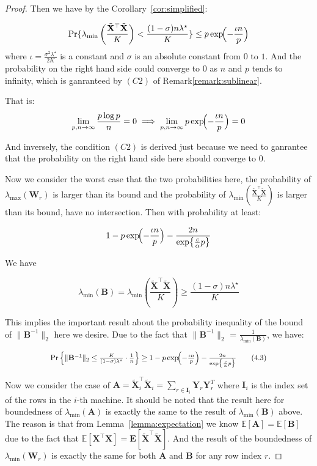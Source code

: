 \documentclass[11pt]{article}
\numberwithin{equation}{section}
\theoremstyle{plain}
\theoremstyle{definition}
\theoremstyle{remark}
\begin{document}
\begin{proof}
Then we have by the Corollary~\ref{cor:simplified}:

\[
  \Pr\{\lambda_{\min}\left(\frac{\tilde{\mathbf{X}}^{\top}\tilde{\mathbf{X}}}{K}\right)<\frac{(1-\sigma)n\lambda^{\star}}{K}\}
    \le p\exp\!\Bigl(-\frac{\iota n}{p}\Bigr)
\]
where $\iota = \frac{\sigma^{2}\lambda^{\star}}{2 K}$ is a constant and $\sigma$ is an absolute constant from $0$ to $1$. And the probability on the right hand side could converge to 0 as $n$ and $p$ tends to infinity, which is ganranteed by $(C2)$ of Remark\ref{remark:sublinear}.

That is:
\[
\lim_{p,n \to \infty} \frac{p \log p}{n} = 0 \implies  \lim_{p,n \to \infty} p\exp\!\Bigl(-\frac{\iota n}{p}\Bigr) = 0
\]

And inversely, the condition $(C2)$ is derived just because we need to ganrantee that the probability on the right hand side here should converge to 0.

Now we consider the worst case that the two probabilities here, the probability of $\lambda_{\max}(\mathbf{W}_r)$ is larger than its bound and the probability of $\lambda_{\min}(\frac{\tilde{\mathbf{X}}^{\top}\tilde{\mathbf{X}}}{K})$ is larger than its bound, have no intersection. Then with probability at least:

\[
1- p\exp\!\Bigl(-\frac{\iota n}{p}\Bigr) - \frac{2 n}{\exp\bigl\{\frac{c}{\alpha} p\bigr\}}
\]

We have 

\[
  \lambda_{\min}(\mathbf{B}) = \lambda_{\min}(\frac{\tilde{\mathbf{X}}^{\top}\tilde{\mathbf{X}}}{K})\ge\frac{(1-\sigma)n\lambda^{\star}}{K}
\]

This implies the important result about the probability inequality of the bound of \(\|\mathbf{B}^{-1}\|_2\) here we desire. Due to the fact that \(\|\mathbf{B}^{-1}\|_2\) = \(\frac{1}{\lambda_{\min}(\mathbf{B})}\), we have:

\[
\scalebox{0.87}{$
  \Pr\left\{\|\mathbf{B}^{-1}\|_2 \le\frac{K}{(1-\sigma)\lambda^{\star}}\cdot\frac{1}{n}\right\}\ge 1- p\exp\!\Bigl(-\frac{\iota n}{p}\Bigr) - \frac{2 n}{\exp\bigl\{\frac{c}{\alpha} p\bigr\}}\tag{4.3}\label{eq:4.3}
$}
\]


Now we consider the case of $\mathbf{A} = \tilde{\mathbf{X}}_i^{\top}\tilde{\mathbf{X}}_i = \sum_{r\in \mathbf{I}_i} \mathbf{Y}_r\mathbf{Y}_r^T$ where $\mathbf{I}_i$ is the index set of the rows in the $i$-th machine.
It should be noted that the result here for boundedness of $\lambda_{\min}(\mathbf{A})$ is exactly the same to the result of $\lambda_{\min}(\mathbf{B})$ above. The reason is that from Lemma~\ref{lemma:expectation} we know $\mathbb{E}[\mathbf{A}] = \mathbb{E}[\mathbf{B}]$ due to the fact that $\mathbb{E}[\mathbf{X}^{\top}\mathbf{X}] = \mathbf{E}[\tilde{\mathbf{X}}^{\top}\tilde{\mathbf{X}}]$. And the result of the boundedness of $\lambda_{\min}(\mathbf{W}_r)$ is exactly the same for both $\mathbf{A}$ and $\mathbf{B}$ for any row index $r$.


\end{proof}
\end{document}
